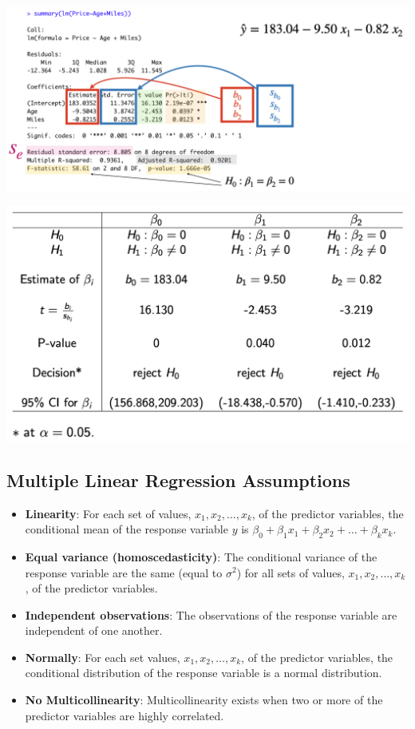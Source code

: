 \documentclass[
]{article}
\begin{document}
\begin{center}\includegraphics[width=0.6\linewidth,height=0.6\textheight]{figures/Routputmulti} \end{center}

\begin{center}\includegraphics[width=0.6\linewidth,height=0.6\textheight]{figures/Routputmultitable} \end{center}

\hypertarget{multiple-linear-regression-assumptions}{%
\subsection{Multiple Linear Regression
Assumptions}\label{multiple-linear-regression-assumptions}}

\begin{itemize}
\item
  \textbf{Linearity}: For each set of values, \(x_1, x_2, \ldots, x_k\),
  of the predictor variables, the conditional mean of the response
  variable \(y\) is
  \(\beta_0+\beta_1 x_1+\beta_2 x_2+ \ldots+ \beta_k x_k\).
\item
  \textbf{Equal variance (homoscedasticity)}: The conditional variance
  of the response variable are the same (equal to \(\sigma^2\)) for all
  sets of values, \(x_1, x_2, \ldots, x_k\), of the predictor variables.
\item
  \textbf{Independent observations}: The observations of the response
  variable are independent of one another.
\item
  \textbf{Normally}: For each set values, \(x_1, x_2, \ldots, x_k\), of
  the predictor variables, the conditional distribution of the response
  variable is a normal distribution.
\item
  \textbf{No Multicollinearity}: Multicollinearity exists when two or
  more of the predictor variables are highly correlated.
\end{itemize}
\end{document}
